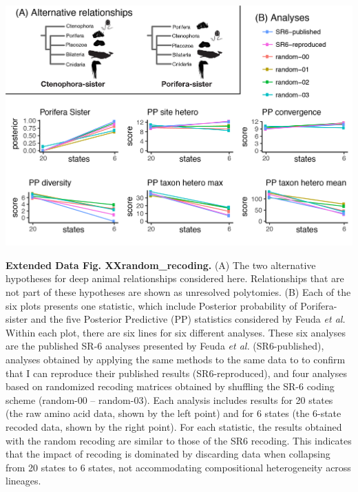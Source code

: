 \documentclass[]{article}
\begin{document}
\includegraphics{figures/Figure_random_rocoding.png}

\textbf{Extended Data Fig. XXrandom\_recoding.} (A) The two alternative
hypotheses for deep animal relationships considered here. Relationships
that are not part of these hypotheses are shown as unresolved
polytomies. (B) Each of the six plots presents one statistic, which
include Posterior probability of Porifera-sister and the five Posterior
Predictive (PP) statistics considered by Feuda \emph{et al.} Within each
plot, there are six lines for six different analyses. These six analyses
are the published SR-6 analyses presented by Feuda \emph{et al.}
(SR6-published), analyses obtained by applying the same methods to the
same data to to confirm that I can reproduce their published results
(SR6-reproduced), and four analyses based on randomized recoding
matrices obtained by shuffling the SR-6 coding scheme (random-00 --
random-03). Each analysis includes results for 20 states (the raw amino
acid data, shown by the left point) and for 6 states (the 6-state
recoded data, shown by the right point). For each statistic, the results
obtained with the random recoding are similar to those of the SR6
recoding. This indicates that the impact of recoding is dominated by
discarding data when collapsing from 20 states to 6 states, not
accommodating compositional heterogeneity across lineages.
\end{document}

